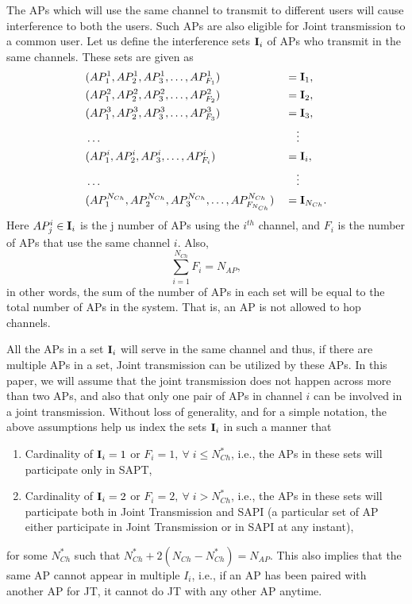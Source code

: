 The APs which will use the same channel to transmit to different users will cause interference to both the users. Such APs are also eligible for Joint transmission to a common user.
Let us define the interference sets $\textbf{I}_i$ of APs who transmit in the same channels. These sets are given as
\begin{align*}
    & (AP_1^1,AP_2^1,AP_3^1,\ldots,AP_{F_1}^1) &&= \textbf{I}_1,\\
    & (AP_1^2,AP_2^2,AP_3^2,\ldots,AP_{F_2}^2) &&= \textbf{I}_2,\\
    & (AP_1^3,AP_2^3,AP_3^3,\ldots,AP_{F_3}^3) &&= \textbf{I}_3,\\
    & \ldots&&\quad\vdots\\
    & (AP_1^i,AP_2^i,AP_3^i,\ldots,AP_{F_i}^i) &&= \textbf{I}_i,\\
    & \ldots&&\quad\vdots\\
    & (AP_1^{N_{Ch}},AP_2^{N_{Ch}},AP_3^{N_{Ch}},\ldots,AP_{F_{N_{Ch}}}^{N_{Ch}})&& = \textbf{I}_{N_{Ch}}.
\end{align*}
Here $AP_{j}^i \in \textbf{I}_i$ is the j number of APs using the $i^{th}$ channel, and $F_i$ is the number of APs that use the same channel $i$. Also,
\begin{equation}
\label{eq:TotalAPs}
    \sum_{i=1}^{N_{Ch}} F_i = N_{AP},
\end{equation}
in other words, the sum of the number of APs in each set will be equal to the total number of APs in the system. That is, an AP is not allowed to hop channels.

All the APs in a set $\textbf{I}_i$ will serve in the same channel and thus, if there are multiple APs in a set, Joint transmission can be utilized by these APs. 
In this paper, we will assume that the joint transmission does not happen across more than two APs, and also that only one pair of APs in channel $i$ can be involved in a joint transmission.
Without loss of generality, and for a simple notation, the above assumptions help us index the sets $\textbf{I}_i$ in such a manner that
\begin{enumerate}
    \item Cardinality of $\textbf{I}_i = 1$ or $F_i = 1, \: \forall \;i \leq N_{Ch}^*$, i.e., the APs in these sets will participate only in  SAPT,
    
    \item Cardinality of $\textbf{I}_i = 2$ or $F_i = 2, \: \forall \;i > N_{Ch}^*$, i.e., the APs in these sets will participate both in Joint Transmission and SAPI (a particular set of AP either participate in Joint Transmission or in SAPI at any instant), 
\end{enumerate}
for some $N^*_{Ch}$ such that $N^*_{Ch}+2(N_{Ch}-N^*_{Ch}) = N_{AP}$. This also implies that the same AP cannot appear in multiple $I_i$, i.e., if an AP has been paired with another AP for JT, it cannot do JT with any other AP anytime.

